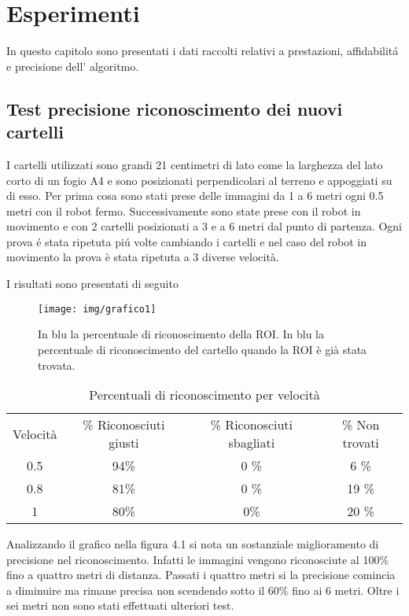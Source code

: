 
\chapter{Esperimenti}
In questo capitolo sono presentati i dati raccolti relativi a prestazioni, affidabilit\'a e precisione dell' algoritmo.

\section{Test precisione riconoscimento dei nuovi cartelli}
	
	I cartelli utilizzati sono grandi 21 centimetri di lato come la larghezza del lato corto di un fogio A4 e sono posizionati perpendicolari al terreno e appoggiati su di esso.
	Per prima cosa sono stati prese delle immagini da 1 a 6 metri ogni 0.5 metri con il robot fermo. Successivamente sono state prese con il robot in movimento e con 2 cartelli posizionati a 3 e a 6 metri dal punto di partenza. Ogni prova \'e stata ripetuta pi\'u volte cambiando i cartelli e nel caso del robot in movimento la prova è stata ripetuta a 3 diverse velocità.

	I risultati sono presentati di seguito

	\begin{figure}[!ht]
		\centering
		\texttt{[image: img/grafico1]}
		\caption{In blu la percentuale di riconoscimento della ROI. In blu la percentuale di riconoscimento del cartello quando la ROI è già stata trovata.}
	\end{figure}

	\begin{table}[h]
		\centering
		\begin{tabular}{cccc}
		    Velocità & \% Riconosciuti giusti & \% Riconosciuti sbagliati & \% Non trovati \\
			0.5 &   94\%    & 0 \%		& 6 \%    	\\
			0.8 &   81\%    & 0 \%		& 19 \%		\\
			1 	& 	80\%	& 0\%		& 20 \%		\\
		\end{tabular}
		\caption{Percentuali di riconoscimento per velocità}
	\end{table}

	Analizzando il grafico nella figura 4.1 si nota un sostanziale miglioramento di precisione nel riconoscimento. Infatti le immagini vengono riconosciute al 100\% fino a quattro metri di distanza. Passati i quattro metri si la precisione comincia a diminuire ma rimane precisa non scendendo sotto il 60\% fino ai 6 metri. Oltre i sei metri non sono stati effettuati ulteriori test.

